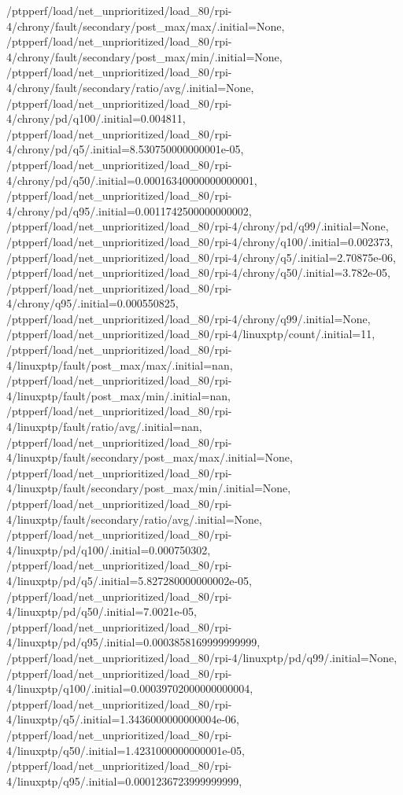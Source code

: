 {    /ptpperf/load/net_unprioritized/load_80/rpi-4/chrony/fault/secondary/post_max/max/.initial=None,
    /ptpperf/load/net_unprioritized/load_80/rpi-4/chrony/fault/secondary/post_max/min/.initial=None,
    /ptpperf/load/net_unprioritized/load_80/rpi-4/chrony/fault/secondary/ratio/avg/.initial=None,
    /ptpperf/load/net_unprioritized/load_80/rpi-4/chrony/pd/q100/.initial=0.004811,
    /ptpperf/load/net_unprioritized/load_80/rpi-4/chrony/pd/q5/.initial=8.530750000000001e-05,
    /ptpperf/load/net_unprioritized/load_80/rpi-4/chrony/pd/q50/.initial=0.00016340000000000001,
    /ptpperf/load/net_unprioritized/load_80/rpi-4/chrony/pd/q95/.initial=0.0011742500000000002,
    /ptpperf/load/net_unprioritized/load_80/rpi-4/chrony/pd/q99/.initial=None,
    /ptpperf/load/net_unprioritized/load_80/rpi-4/chrony/q100/.initial=0.002373,
    /ptpperf/load/net_unprioritized/load_80/rpi-4/chrony/q5/.initial=2.70875e-06,
    /ptpperf/load/net_unprioritized/load_80/rpi-4/chrony/q50/.initial=3.782e-05,
    /ptpperf/load/net_unprioritized/load_80/rpi-4/chrony/q95/.initial=0.000550825,
    /ptpperf/load/net_unprioritized/load_80/rpi-4/chrony/q99/.initial=None,
    /ptpperf/load/net_unprioritized/load_80/rpi-4/linuxptp/count/.initial=11,
    /ptpperf/load/net_unprioritized/load_80/rpi-4/linuxptp/fault/post_max/max/.initial=nan,
    /ptpperf/load/net_unprioritized/load_80/rpi-4/linuxptp/fault/post_max/min/.initial=nan,
    /ptpperf/load/net_unprioritized/load_80/rpi-4/linuxptp/fault/ratio/avg/.initial=nan,
    /ptpperf/load/net_unprioritized/load_80/rpi-4/linuxptp/fault/secondary/post_max/max/.initial=None,
    /ptpperf/load/net_unprioritized/load_80/rpi-4/linuxptp/fault/secondary/post_max/min/.initial=None,
    /ptpperf/load/net_unprioritized/load_80/rpi-4/linuxptp/fault/secondary/ratio/avg/.initial=None,
    /ptpperf/load/net_unprioritized/load_80/rpi-4/linuxptp/pd/q100/.initial=0.000750302,
    /ptpperf/load/net_unprioritized/load_80/rpi-4/linuxptp/pd/q5/.initial=5.827280000000002e-05,
    /ptpperf/load/net_unprioritized/load_80/rpi-4/linuxptp/pd/q50/.initial=7.0021e-05,
    /ptpperf/load/net_unprioritized/load_80/rpi-4/linuxptp/pd/q95/.initial=0.0003858169999999999,
    /ptpperf/load/net_unprioritized/load_80/rpi-4/linuxptp/pd/q99/.initial=None,
    /ptpperf/load/net_unprioritized/load_80/rpi-4/linuxptp/q100/.initial=0.00039702000000000004,
    /ptpperf/load/net_unprioritized/load_80/rpi-4/linuxptp/q5/.initial=1.3436000000000004e-06,
    /ptpperf/load/net_unprioritized/load_80/rpi-4/linuxptp/q50/.initial=1.4231000000000001e-05,
    /ptpperf/load/net_unprioritized/load_80/rpi-4/linuxptp/q95/.initial=0.0001236723999999999,
}
